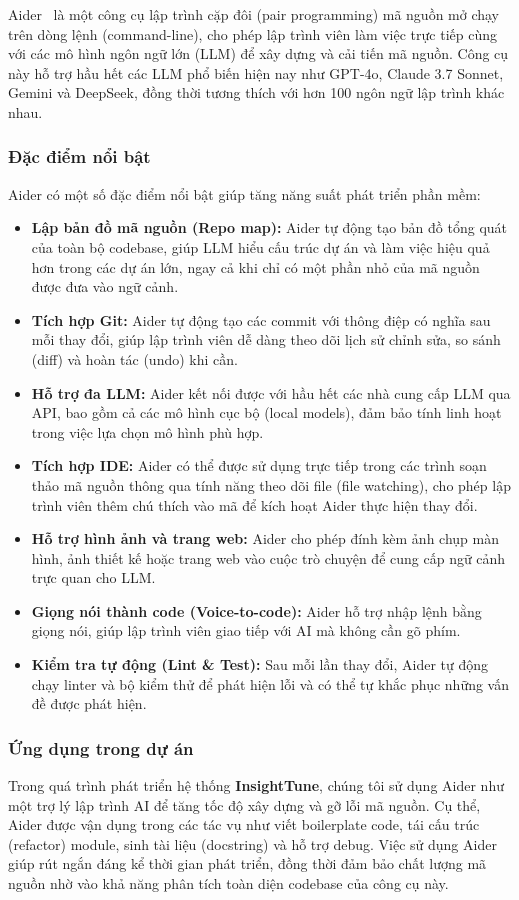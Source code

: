 Aider~\cite{aider2024} là một công cụ lập trình cặp đôi (pair programming) mã nguồn mở chạy trên dòng lệnh (command-line), cho phép lập trình viên làm việc trực 
tiếp cùng với các mô hình ngôn ngữ lớn (LLM) để xây dựng và cải tiến mã nguồn. Công cụ này hỗ trợ hầu hết các LLM phổ biến hiện nay như GPT-4o, Claude 3.7 Sonnet, 
Gemini và DeepSeek, đồng thời tương thích với hơn 100 ngôn ngữ lập trình khác nhau.

\subsubsection{Đặc điểm nổi bật}

Aider có một số đặc điểm nổi bật giúp tăng năng suất phát triển phần mềm:
\begin{itemize}
    \item \textbf{Lập bản đồ mã nguồn (Repo map):} Aider tự động tạo bản đồ tổng quát của toàn bộ codebase, giúp LLM hiểu cấu trúc dự án và làm việc hiệu quả hơn 
    trong các dự án lớn, ngay cả khi chỉ có một phần nhỏ của mã nguồn được đưa vào ngữ cảnh.
    \item \textbf{Tích hợp Git:} Aider tự động tạo các commit với thông điệp có nghĩa sau mỗi thay đổi, giúp lập trình viên dễ dàng theo dõi lịch sử chỉnh sửa, 
    so sánh (diff) và hoàn tác (undo) khi cần.
    \item \textbf{Hỗ trợ đa LLM:} Aider kết nối được với hầu hết các nhà cung cấp LLM qua API, bao gồm cả các mô hình cục bộ (local models), đảm bảo tính 
    linh hoạt trong việc lựa chọn mô hình phù hợp.
    \item \textbf{Tích hợp IDE:} Aider có thể được sử dụng trực tiếp trong các trình soạn thảo mã nguồn thông qua tính năng theo dõi file (file watching), 
    cho phép lập trình viên thêm chú thích vào mã để kích hoạt Aider thực hiện thay đổi.
    \item \textbf{Hỗ trợ hình ảnh và trang web:} Aider cho phép đính kèm ảnh chụp màn hình, ảnh thiết kế hoặc trang web vào cuộc trò chuyện để cung cấp 
    ngữ cảnh trực quan cho LLM.
    \item \textbf{Giọng nói thành code (Voice-to-code):} Aider hỗ trợ nhập lệnh bằng giọng nói, giúp lập trình viên giao tiếp với AI mà không cần gõ phím.
    \item \textbf{Kiểm tra tự động (Lint \& Test):} Sau mỗi lần thay đổi, Aider tự động chạy linter và bộ kiểm thử để phát hiện lỗi và có thể tự khắc phục 
    những vấn đề được phát hiện.
\end{itemize}

\subsubsection{Ứng dụng trong dự án}

Trong quá trình phát triển hệ thống \textbf{InsightTune}, chúng tôi sử dụng Aider như một trợ lý lập trình AI để tăng tốc độ xây dựng và gỡ lỗi mã nguồn. 
Cụ thể, Aider được vận dụng trong các tác vụ như viết boilerplate code, tái cấu trúc (refactor) module, sinh tài liệu (docstring) và hỗ trợ debug. 
Việc sử dụng Aider giúp rút ngắn đáng kể thời gian phát triển, đồng thời đảm bảo chất lượng mã nguồn nhờ vào khả năng phân tích toàn diện codebase của công cụ này.